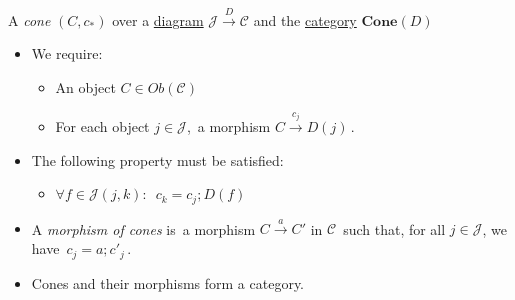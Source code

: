 A \emph{cone} $(C,c_*)$ over a \hyperref[D3.51]{diagram} $\mathcal{J}\xrightarrow{D}\mathcal{C}$ and the \hyperref[D3.6]{category} $\mathbf{Cone}(D)$

\begin{itemize}
    \item  We require:
          \begin{itemize}
            \item An object $C \in Ob(\mathcal{C})$
            \item For each object $j \in \mathcal{J}$, \,a morphism $C \xrightarrow{c_j}D(j)$\,.
          \end{itemize}
    \item The following property must be satisfied:
          \begin{itemize}
            \item $\forall f \in \mathcal{J}(j,k):$ \,$c_k=c_j;D(f)$\,
          \end{itemize}
    \item A \emph{morphism of cones} is \,a morphism $C \xrightarrow{a} C'$ in $\mathcal{C}$\, such that, for all $j \in \mathcal{J}$, we have \,$c_j=a;c'_j$\,.
    \item Cones and their morphisms form a category.
  \end{itemize}
